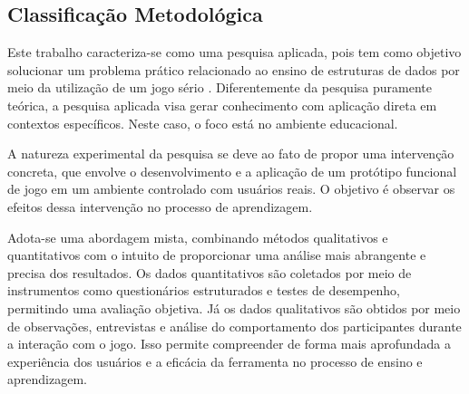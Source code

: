 \subsection{Classificação Metodológica}

Este trabalho caracteriza-se como uma pesquisa aplicada, pois tem como objetivo
solucionar um problema prático relacionado ao ensino de estruturas de dados por
meio da utilização de um jogo sério \cite{mouaheb2012serious}. Diferentemente
da pesquisa puramente teórica, a pesquisa aplicada visa gerar conhecimento com
aplicação direta em contextos específicos. Neste caso, o foco está no ambiente
educacional.

A natureza experimental da pesquisa se deve ao fato de propor uma intervenção
concreta, que envolve o desenvolvimento e a aplicação de um protótipo funcional
de jogo em um ambiente controlado com usuários reais. O objetivo é observar os
efeitos dessa intervenção no processo de aprendizagem.

Adota-se uma abordagem mista, combinando métodos qualitativos e quantitativos
com o intuito de proporcionar uma análise mais abrangente e precisa dos
resultados. Os dados quantitativos são coletados por meio de instrumentos como
questionários estruturados e testes de desempenho, permitindo uma avaliação
objetiva. Já os dados qualitativos são obtidos por meio de observações,
entrevistas e análise do comportamento dos participantes durante a interação
com o jogo. Isso permite compreender de forma mais aprofundada a experiência
dos usuários e a eficácia da ferramenta no processo de ensino e aprendizagem.
